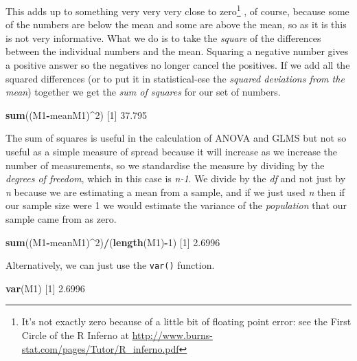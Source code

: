 \documentclass[
]{book}
\newenvironment{Shaded}{\begin{snugshade}}{\end{snugshade}}
\newcommand{\DecValTok}[1]{\textcolor[rgb]{0.00,0.00,0.81}{#1}}
\newcommand{\FloatTok}[1]{\textcolor[rgb]{0.00,0.00,0.81}{#1}}
\newcommand{\KeywordTok}[1]{\textcolor[rgb]{0.13,0.29,0.53}{\textbf{#1}}}
\newcommand{\NormalTok}[1]{#1}
\newcommand{\OperatorTok}[1]{\textcolor[rgb]{0.81,0.36,0.00}{\textbf{#1}}}
\begin{document}
This adds up to something very very very close to zero\footnote{It's not exactly zero because of a little bit of floating point error: see the First Circle of the R Inferno at \href{http://www.burns-stat.com/pages/Tutor/R_inferno.pdf\%20if\%20you\%20want\%20to\%20know\%20more}{http://www.burns-stat.com/pages/Tutor/R\_inferno.pdf}} , of course, because some of the numbers are below the mean and some are above the mean, so as it is this is not very informative. What we do is to take the \emph{square} of the differences between the individual numbers and the mean. Squaring a negative number gives a positive answer so the negatives no longer cancel the positives. If we add all the squared differences (or to put it in statistical-ese the \emph{squared deviations from the mean}) together we get the \emph{sum of squares} for our set of numbers.

\begin{Shaded}
\begin{Highlighting}[]
\KeywordTok{sum}\NormalTok{((M1}\OperatorTok{-}\NormalTok{meanM1)}\OperatorTok{^}\DecValTok{2}\NormalTok{)}
\NormalTok{[}\DecValTok{1}\NormalTok{] }\FloatTok{37.795}
\end{Highlighting}
\end{Shaded}

The sum of squares is useful in the calculation of ANOVA and GLMS but not so useful as a simple measure of spread because it will increase as we increase the number of measurements, so we standardise the measure by dividing by the \emph{degrees of freedom}, which in this case is \emph{n-1}. We divide by the \emph{df} and not just by \emph{n} because we are estimating a mean from a sample, and if we just used \emph{n} then if our sample size were 1 we would estimate the variance of the \emph{population} that our sample came from as zero.

\begin{Shaded}
\begin{Highlighting}[]
\KeywordTok{sum}\NormalTok{((M1}\OperatorTok{-}\NormalTok{meanM1)}\OperatorTok{^}\DecValTok{2}\NormalTok{)}\OperatorTok{/}\NormalTok{(}\KeywordTok{length}\NormalTok{(M1)}\OperatorTok{-}\DecValTok{1}\NormalTok{)}
\NormalTok{[}\DecValTok{1}\NormalTok{] }\FloatTok{2.6996}
\end{Highlighting}
\end{Shaded}

Alternatively, we can just use the \texttt{var()} function.

\begin{Shaded}
\begin{Highlighting}[]
\KeywordTok{var}\NormalTok{(M1)}
\NormalTok{[}\DecValTok{1}\NormalTok{] }\FloatTok{2.6996}
\end{Highlighting}
\end{Shaded}
\end{document}

